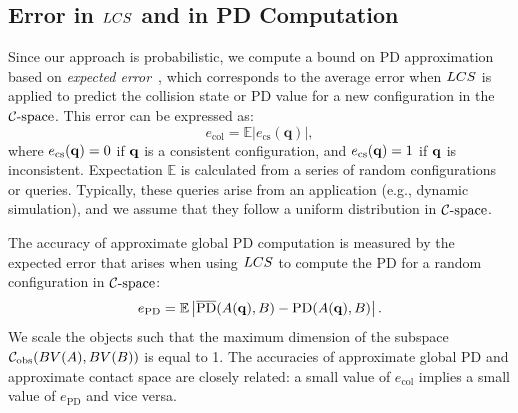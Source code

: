 \subsection{Error in $LCS$ and in PD Computation}
\label{sec:errordefine}
Since our approach is probabilistic, we compute a bound on PD approximation based on \emph{expected
error}~\cite{Vapnik:1995:NSL}, which corresponds to the average error
when $LCS$ is applied to predict the
collision state or PD value for a new configuration in the $\mathcal C\text{-space}$.
This error can be expressed as:
\begin{equation}
\label{eq:2:Errdef0} e_{\text{col}} = \mathbb E
\left|e_\text{cs}(\mathbf q) \right|,
\end{equation}
where $e_{\text{cs}}(\mathbf q)=0$ if $\mathbf q$ is a consistent configuration, and $e_{\text{cs}}(\mathbf q)=1$ if $\mathbf q$ is inconsistent.
Expectation $\mathbb E$ is calculated from a series of
random configurations or queries. Typically, these queries arise from an application (e.g., dynamic simulation), and
we assume that they follow a uniform distribution in $\mathcal C\text{-space}$.

The accuracy of approximate global PD computation is measured by the expected error that arises
when using $LCS$ to compute the PD for a random configuration in $\mathcal C\text{-space}$:
\begin{equation}
\label{eq:2:Errdef} e_{\text{PD}} = \mathbb E
\left|\overline{\text{PD}}(A(\mathbf q), B) - \text{PD}(A(\mathbf q), B)\right|.
\end{equation}
We scale the objects such that the maximum dimension of the subspace $\mathcal C_{\text{obs}} (BV(A),BV(B))$ is equal to 1.
The accuracies of approximate global PD and approximate contact space are closely related: a small value of $e_{\text{col}}$ implies a small value of $e_{\text{PD}}$ and vice versa.


